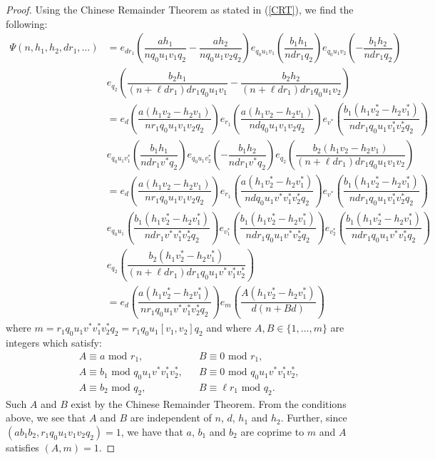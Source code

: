 \documentclass{amsart}
\numberwithin{equation}{section}
\begin{document}
\begin{proof}
Using the Chinese Remainder Theorem as stated in (\ref{CRT}), we find the following: 
  \begin{align*}
 \Psi(n,h_1,h_2, dr_1, \dots)  
&=e_{dr_1}\left(\dfrac{ah_1}{nq_0u_1v_1q_2}-\dfrac{ah_2}{nq_0u_1v_2q_2}\right)e_{q_0u_1v_1}\left(\dfrac{b_1h_1}{ndr_1q_2}\right)e_{q_0u_1v_2}\left(-\dfrac{b_1h_2}{ndr_1q_2}\right) \\
  &e_{q_2}\left(\dfrac{b_2h_1}{(n+\ell dr_1)dr_1q_0u_1v_1}-\dfrac{b_2h_2}{(n+\ell dr_1)dr_1q_0u_1v_2}\right)\\
 &= e_{d}\left(\dfrac{a(h_1v_2-h_2v_1)}{nr_1q_0u_1v_1v_2q_2}\right)e_{r_1}\left(\dfrac{a(h_1v_2-h_2v_1)}{ndq_0u_1v_1v_2q_2}\right)e_{v^*}\left(\dfrac{b_1(h_1v_2^*-h_2v_1^*)}{ndr_1q_0u_1v_1^*v_2^*q_2}\right)\\
 &e_{q_0u_1v_1^*}\left(\dfrac{b_1h_1}{ndr_1v^*q_2}\right)e_{q_0u_1v_2^*}\left(-\dfrac{b_1h_2}{ndr_1v^*q_2}\right)e_{q_2}\left(\dfrac{b_2(h_1v_2-h_2v_1)}{(n+\ell dr_1)dr_1q_0u_1v_1v_2}\right)\\ 
 &= e_{d}\left(\dfrac{a(h_1v_2-h_2v_1)}{nr_1q_0u_1v_1v_2q_2}\right)e_{r_1}\left(\dfrac{a(h_1v_2^*-h_2v_1^*)}{ndq_0u_1v^*v_1^*v_2^*q_2}\right)e_{v^*}\left(\dfrac{b_1(h_1v_2^*-h_2v_1^*)}{ndr_1q_0u_1v_1^*v_2^*q_2}\right)\\
 &e_{q_0u_1}\left(\dfrac{b_1(h_1v_2^*-h_2v_1^*)}{ndr_1v^*v_1^*v_2^*q_2}\right)e_{v_1^*}\left(\dfrac{b_1(h_1v_2^*-h_2v_1^*)}{ndr_1q_0u_1v^*v_2^*q_2}\right)e_{v_2^*}\left(\dfrac{b_1(h_1v_2^*-h_2v_1^*)}{ndr_1q_0u_1v^*v_1^*q_2}\right) \\
 &e_{q_2}\left(\dfrac{b_2(h_1v_2^*-h_2v_1^*)}{(n+\ell dr_1)dr_1q_0u_1v^*v_1^*v_2^*}\right)\\ 
  &= e_{d}\left(\dfrac{a(h_1v_2^*-h_2v_1^*)}{nr_1q_0u_1v^*v_1^*v_2^*q_2}\right) e_{m}\left(\dfrac{A (h_1v_2^*-h_2v_1^*) }{d(n+B d)}\right) 
 \end{align*}
 where  $m= r_1q_0u_1v^*v_1^*v_2^*q_2 = r_1q_0 u_1 [v_1,v_2]q_2$   and where $A, B \in \{1,\dots,m\}$ are integers which satisfy:
\begin{align*}
&A \equiv a \mbox{ mod } r_1,   &&B \equiv 0 \mbox{ mod } r_1, \\
&A \equiv b_1 \mbox{ mod } q_0 u_1 v^*v_1^*v_2^*,   &&B \equiv 0 \mbox{ mod } q_0 u_1 v^*v_1^*v_2^*, \\
&A \equiv b_2 \mbox{ mod } q_2, 
&&B \equiv \ell r_1 \mbox{ mod } q_2. 
\end{align*}
Such $A$ and $B$ exist by the Chinese Remainder Theorem. From the conditions above, we see that $A$ and $B$  are independent of $n$, $d$, $h_1$ and $h_2$. Further, since $(ab_1b_2,r_1q_0u_1v_1v_2q_2)=1$, we have that $a$, $b_1$ and $b_2$ are coprime to $m$ and   $A$ satisfies $ (A,m)=1$.
\end{proof}
\end{document}
